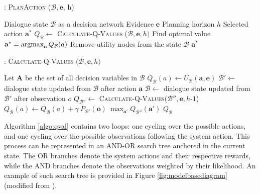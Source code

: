 \begin{algorithm}[h!]
\caption{: \textsc{PlanAction} ($\mathcal{B}, \mathbf{e}$, h) }
\begin{algorithmic}[1] \vspace{1mm}
\REQUIRE Dialogue state $\mathcal{B}$ as a decision network
\REQUIRE Evidence $\mathbf{e}$
\REQUIRE Planning horizon $h$
\ENSURE Selected action $\mathbf{a}^*$
\STATE $Q_{\mathcal{B}} \leftarrow $ \textsc{Calculate-Q-Values} ($\mathcal{B}, \mathbf{e}, h)$
\STATE Find optimal value $\mathbf{a}^* = \argmax_{\mathbf{a}} Q_{\mathcal{B}}(a)$
\STATE Remove utility nodes from the state $\mathcal{B}$
\RETURN $\mathbf{a}^*$
\end{algorithmic}
\label{algo:planning}
\end{algorithm}


\begin{algorithm}[h!]
\caption{: \textsc{Calculate-Q-Values} ($\mathcal{B}, \mathbf{e}, h)$}
\begin{algorithmic}[1] \vspace{1mm}
\STATE Let $\mathbf{A}$ be the set of all decision variables in $\mathcal{B}$
\STATE $Q_{\mathcal{B}}(a) \leftarrow U_{\mathcal{B}}(\mathbf{a}, \mathbf{e})$
\STATE $\mathcal{B}' \leftarrow $ dialogue state updated from $\mathcal{B}$ after action $\mathbf{a}$
\STATE $\mathcal{B} \leftarrow $ dialogue state updated from $\mathcal{B}'$ after observation $o$
\STATE $Q_{\mathcal{B}''} \leftarrow $ \textsc{Calculate-Q-Values}($\mathcal{B}'', \mathbf{e}, h\mbox{-}1$)
\STATE $Q_{\mathcal{B}}(a) \leftarrow Q_{\mathcal{B}}(a) + \gamma \ P_{\mathcal{B}'}(\mathbf{o}) \ \max_{\mathbf{a}'} Q_{\mathcal{B}''}(\mathbf{a}')$
\ENDFOR
\ENDIF
\ENDFOR
\RETURN $Q_{\mathcal{B}}$
\end{algorithmic} 
\label{algo:qval}
\end{algorithm}

Algorithm \ref{algo:qval} contains two loops: one cycling over the possible actions, and one cycling over the possible observations following the system action. This process can be represented in an AND-OR search tree anchored in the current state. The OR branches denote the system actions and their respective rewards, while the AND branches denote the observations weighted by their likelihood. An example of such search tree is provided in Figure \ref{fig:modelbasediagram} (modified from \cite{ross2008}).


